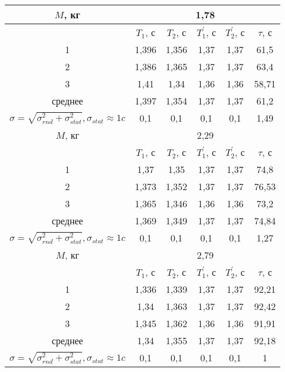 \documentclass[a4paper, 12pt]{article}%
\begin{document}
\begin{table}
\end{table}
\newpage
\begin{center}
\begin{table}
\begin{center}
\begin{tabular}{|c|c|c|c|c|c|}
\hline
$M$, кг&\multicolumn{5}{|c|}{1,78} \\
\hline
&$T_1$, с&$T_2$, с&$T_1^{'}$, с&$T_2^{'}$, с& $ \tau $, с \\
\hline
1&1,396&1,356&1,37&1,37&61,5\\
\hline
2&1,386&1,365&1,37&1,37&63,4\\
\hline
3&1,41&1,34&1,36&1,36&58,71\\
\hline
среднее&1,397&1,354&1,37&1,37&61,2 \\
\hline
$\sigma = \sqrt{\sigma_{rnd}^2 + \sigma_{stat}^2}, \sigma_{stat} \approx 1 c$&0,1&0,1&0,1&0,1&1,49 \\
\hline
$M$, кг&\multicolumn{5}{|c|}{2,29} \\
\hline
&$T_1$, с&$T_2$, с&$T_1^{'}$, с&$T_2^{'}$, с& $ \tau $, с \\
\hline
1&1,37&1,35&1,37&1,37&74,8\\
\hline
2&1,373&1,352&1,37&1,37&76,53\\
\hline
3&1,365&1,346&1,36&1,36&73,2\\
\hline
среднее&1,369&1,349&1,37&1,37&74,84 \\
\hline
$\sigma = \sqrt{\sigma_{rnd}^2 + \sigma_{stat}^2}, \sigma_{stat} \approx 1 c$&0,1&0,1&0,1&0,1&1,27\\
\hline
$M$, кг&\multicolumn{5}{|c|}{2,79} \\
\hline
&$T_1$, с&$T_2$, с&$T_1^{'}$, с&$T_2^{'}$, с& $ \tau $, с \\
\hline
1&1,336&1,339&1,37&1,37&92,21 \\
\hline
2&1,34&1,363&1,37&1,37&92,42 \\
\hline
3&1,345&1,362&1,36&1,36&91,91 \\
\hline
среднее&1,34&1,355&1,37&1,37&92,18 \\
\hline
$\sigma = \sqrt{\sigma_{rnd}^2 + \sigma_{stat}^2}, \sigma_{stat} \approx 1 c$&0,1&0,1&0,1&0,1&1 \\

\end{tabular}
\end{center}
\end{table}
\end{center}
\end{document}
